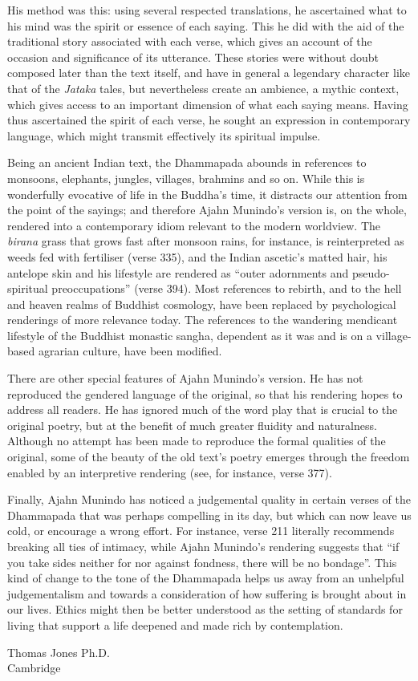 His method was this: using several respected translations, he ascertained what to his mind was the spirit or essence of each saying. This he did with the aid of the traditional story associated with each verse, which gives an account of the occasion and significance of its utterance. These stories were without doubt composed later than the text itself, and have in general a legendary character like that of the \emph{Jataka} tales, but nevertheless create an ambience, a mythic context, which gives access to an important dimension of what each saying means. Having thus ascertained the spirit of each verse, he sought an expression in contemporary language, which might transmit effectively its spiritual impulse.

Being an ancient Indian text, the Dhammapada abounds in references to monsoons, elephants, jungles, villages, brahmins and so on. While this is wonderfully evocative of life in the Buddha’s time, it distracts our attention from the point of the sayings; and therefore Ajahn Munindo’s version is, on the whole, rendered into a contemporary idiom relevant to the modern worldview. The \emph{birana} grass that grows fast after monsoon rains, for instance, is reinterpreted as weeds fed with fertiliser (verse 335), and the Indian ascetic’s matted hair, his antelope skin and his lifestyle are rendered as “outer adornments and pseudo-spiritual preoccupations” (verse 394). Most references to rebirth, and to the hell and heaven realms of Buddhist cosmology, have been replaced by psychological renderings of more relevance today. The references to the wandering mendicant lifestyle of the Buddhist monastic sangha, dependent as it was and is on a village-based agrarian culture, have been modified.

There are other special features of Ajahn Munindo’s version. He has not reproduced the gendered language of the original, so that his rendering hopes to address all readers. He has ignored much of the word play that is crucial to the original poetry, but at the benefit of much greater fluidity and naturalness. Although no attempt has been made to reproduce the formal qualities of the original, some of the beauty of the old text’s poetry emerges through the freedom enabled by an interpretive rendering (see, for instance, verse 377).

Finally, Ajahn Munindo has noticed a judgemental quality in certain verses of the Dhammapada that was perhaps compelling in its day, but which can now leave us cold, or encourage a wrong effort. For instance, verse 211 literally recommends breaking all ties of intimacy, while Ajahn Munindo’s rendering suggests that “if you take sides neither for nor against fondness, there will be no bondage”. This kind of change to the tone of the Dhammapada helps us away from an unhelpful judgementalism and towards a consideration of how suffering is brought about in our lives. Ethics might then be better understood as the setting of standards for living that support a life deepened and made rich by contemplation.

\bigskip

{\raggedleft
Thomas Jones Ph.D.\\
Cambridge
\par}
